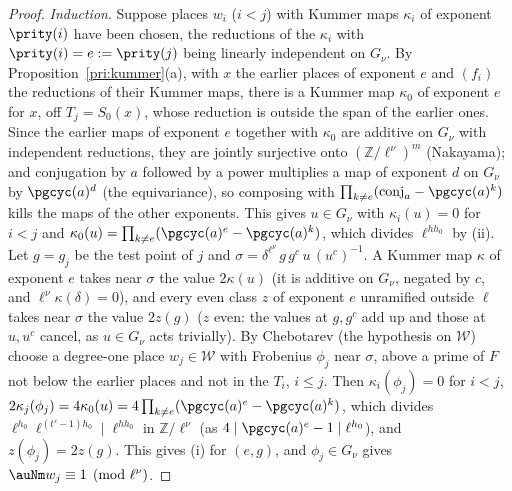 \documentclass[10pt]{amsart}
\theoremstyle{definition}
\theoremstyle{remark}
\newcommand{\Z}{\mathbb Z}
\begin{document}
\begin{proof}
\emph{Induction}.
Suppose places $w_i$ ($i<j$) with Kummer maps $\kappa_i$ of exponent $\prity(i)$ have been chosen,
the reductions of the $\kappa_i$ with $\prity(i)=e:=\prity(j)$ being linearly independent on $G_\nu$.
By Proposition~\ref{pri:kummer}(a), with $x$ the earlier places of exponent $e$ and $(f_i)$ the
reductions of their Kummer maps, there is a Kummer map $\kappa_0$ of exponent $e$ for $x$, off
$T_j=S_0(x)$, whose reduction is outside the span of the earlier ones. Since the earlier maps of exponent $e$ together with $\kappa_0$ are
additive on $G_\nu$ with independent reductions, they are jointly surjective onto $(\Z/\ell^\nu)^m$
(Nakayama); and conjugation by $a$ followed by a power multiplies a map of exponent $d$ on $G_\nu$
by $\pgcyc(a)^{d}$ (the equivariance), so composing with $\prod_{k\ne e}(\mathrm{conj}_a-\pgcyc(a)^k)$
kills the maps of the other exponents. This gives $u\in G_\nu$ with $\kappa_i(u)=0$ for $i<j$ and
$\kappa_0(u)=\prod_{k\ne e}(\pgcyc(a)^e-\pgcyc(a)^k)$, which divides $\ell^{hh_0}$ by (ii). Let
$g=g_j$ be the test point of $j$ and $\sigma=\delta^{\ell^\nu}\,g\,g^c\,u\,(u^c)^{-1}$. A Kummer map
$\kappa$ of exponent $e$ takes near $\sigma$ the value $2\kappa(u)$ (it is additive on $G_\nu$,
negated by $c$, and $\ell^\nu\kappa(\delta)=0$), and every even class $z$ of exponent $e$ unramified
outside $\ell$ takes near $\sigma$ the value $2z(g)$ ($z$ even: the values at $g,g^c$ add up and
those at $u,u^c$ cancel, as $u\in G_\nu$ acts trivially). By Chebotarev (the hypothesis on $\mathcal
W$) choose a degree-one place $w_j\in\mathcal W$ with Frobenius $\phi_j$ near $\sigma$, above a
prime of $F$ not below the earlier places and not in the $T_i$, $i\le j$. Then $\kappa_i(\phi_j)=0$
for $i<j$, $2\kappa_j(\phi_j)=4\kappa_0(u)=4\prod_{k\ne e}(\pgcyc(a)^e-\pgcyc(a)^k)$, which divides
$\ell^{h_0}\ell^{(t'-1)h_0}\mid\ell^{hh_0}$ in $\Z/\ell^\nu$ (as $4\mid\pgcyc(a)^e-1\mid\ell^{h_0}$),
and $z(\phi_j)=2z(g)$. This gives (i) for $(e,g)$, and $\phi_j\in G_\nu$ gives $\auNm w_j\equiv1\pmod{\ell^\nu}$.


\end{proof}
\end{document}

